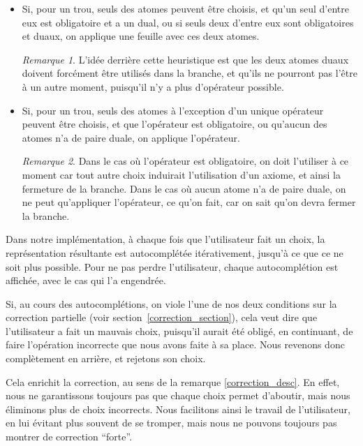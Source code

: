 \documentclass[11pt,a4paper]{article}
\theoremstyle{plain}
\theoremstyle{definition}
\theoremstyle{remark}
\newtheorem{remark}{Remarque}
\begin{document}
\begin{itemize}
    \item Si, pour un trou, seuls des atomes peuvent être choisis, et qu'un seul d'entre eux est obligatoire et a un dual, ou si seuls deux d'entre eux sont obligatoires et duaux, on applique une feuille avec ces deux atomes.

    \begin{remark}
        L'idée derrière cette heuristique est que les deux atomes duaux doivent forcément être utilisés dans la branche, et qu'ils ne pourront pas l'être à un autre moment, puisqu'il n'y a plus d'opérateur possible.
    \end{remark}

    \item Si, pour un trou, seuls des atomes à l'exception d'un unique opérateur peuvent être choisis, et que l'opérateur est obligatoire, ou qu'aucun des atomes n'a de paire duale, on applique l'opérateur.

    \begin{remark}
        Dans le cas où l'opérateur est obligatoire, on doit l'utiliser à ce moment car tout autre choix induirait l'utilisation d'un axiome, et ainsi la fermeture de la branche. Dans le cas où aucun atome n'a de paire duale, on ne peut qu'appliquer l'opérateur, ce qu'on fait, car on sait qu'on devra fermer la branche.
    \end{remark}
\end{itemize}

Dans notre implémentation, à chaque fois que l'utilisateur fait un choix, la représentation résultante est autocomplétée itérativement, jusqu'à ce que ce ne soit plus possible. Pour ne pas perdre l'utilisateur, chaque autocomplétion est affichée, avec le cas qui l'a engendrée.

Si, au cours des autocomplétions, on viole l'une de nos deux conditions sur la correction partielle (voir section~\ref{correction_section}), cela veut dire que l'utilisateur a fait un mauvais choix, puisqu'il aurait été obligé, en continuant, de faire l'opération incorrecte que nous avons faite à sa place. Nous revenons donc complètement en arrière, et rejetons son choix.

Cela enrichit la correction, au sens de la remarque \ref{correction_desc}. En effet, nous ne garantissons toujours pas que chaque choix permet d'aboutir, mais nous éliminons plus de choix incorrects. Nous facilitons ainsi le travail de l'utilisateur, en lui évitant plus souvent de se tromper, mais nous ne pouvons toujours pas montrer de correction ``forte''.
\end{document}
